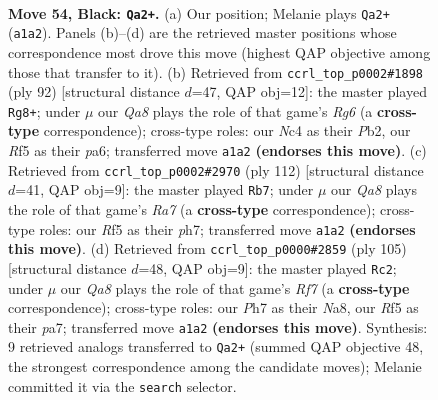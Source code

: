 \documentclass[11pt]{article}
\begin{document}
\clearpage

\begin{figure}[p]\centering
\begin{subfigure}{0.46\textwidth}\centering
\resizebox{\linewidth}{!}{%
\newchessgame
\chessboard[
  setfen={8/2k4p/8/p4r2/2np4/1R6/2K1P3/qN6 b - - 3 54},
  showmover=false,
  pgfstyle=straightmove, color=movearrow, markmove={a1-a2}
]}
\caption{}
\end{subfigure}\hfill
\begin{subfigure}{0.46\textwidth}\centering
\resizebox{\linewidth}{!}{%
\newchessgame
\chessboard[
  setfen={4k3/8/p3n1R1/8/P7/4r1P1/1P5P/1K6 w - - 1 47},
  showmover=false,
  pgfstyle=straightmove, color=movearrow, markmove={g6-g8}
]}
\caption{}
\end{subfigure}
\\[4pt]
\begin{subfigure}{0.46\textwidth}\centering
\resizebox{\linewidth}{!}{%
\newchessgame
\chessboard[
  setfen={5k2/R3n2p/5p1N/4r2P/6P1/5K2/8/8 w - - 7 57},
  showmover=false,
  pgfstyle=straightmove, color=movearrow, markmove={a7-b7}
]}
\caption{}
\end{subfigure}\hfill
\begin{subfigure}{0.46\textwidth}\centering
\resizebox{\linewidth}{!}{%
\newchessgame
\chessboard[
  setfen={n7/P4pk1/2p5/7R/1P1K4/2N2P2/5r1p/8 b - - 14 53},
  showmover=false,
  pgfstyle=straightmove, color=movearrow, markmove={f2-c2}
]}
\caption{}
\end{subfigure}
\caption{\textbf{Move 54, Black: \texttt{Qa2+}.} (a) Our position; Melanie plays \texttt{Qa2+} (\texttt{a1a2}). Panels (b)--(d) are the retrieved master positions whose correspondence most drove this move (highest QAP objective among those that transfer to it). (b) Retrieved from \texttt{ccrl\_top\_p0002\#1898} (ply 92) [structural distance $d$=47, QAP obj=12]: the master played \texttt{Rg8+}; under $\mu$ our \emph{Qa8} plays the role of that game's \emph{Rg6} (a \textbf{cross-type} correspondence); cross-type roles: our \emph{N}c4 as their \emph{P}b2, our \emph{R}f5 as their \emph{p}a6; transferred move \texttt{a1a2} \textbf{(endorses this move)}. (c) Retrieved from \texttt{ccrl\_top\_p0002\#2970} (ply 112) [structural distance $d$=41, QAP obj=9]: the master played \texttt{Rb7}; under $\mu$ our \emph{Qa8} plays the role of that game's \emph{Ra7} (a \textbf{cross-type} correspondence); cross-type roles: our \emph{R}f5 as their \emph{p}h7; transferred move \texttt{a1a2} \textbf{(endorses this move)}. (d) Retrieved from \texttt{ccrl\_top\_p0000\#2859} (ply 105) [structural distance $d$=48, QAP obj=9]: the master played \texttt{Rc2}; under $\mu$ our \emph{Qa8} plays the role of that game's \emph{Rf7} (a \textbf{cross-type} correspondence); cross-type roles: our \emph{P}h7 as their \emph{N}a8, our \emph{R}f5 as their \emph{p}a7; transferred move \texttt{a1a2} \textbf{(endorses this move)}. Synthesis: 9 retrieved analogs transferred to \texttt{Qa2+} (summed QAP objective 48, the strongest correspondence among the candidate moves); Melanie committed it via the \texttt{search} selector.}
\label{fig:thought-m107}
\end{figure}
\end{document}
